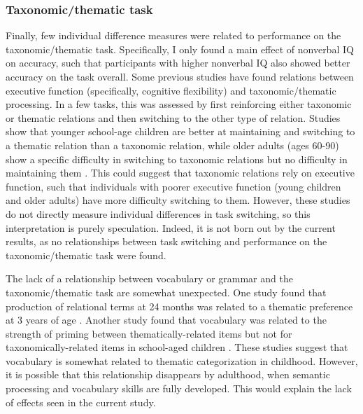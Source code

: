 \documentclass[../dissertation.tex]{subfiles}
\begin{document}
\subsubsection{Taxonomic/thematic task}
	Finally, few individual difference measures were related to performance on the taxonomic/thematic task. Specifically, I only found a main effect of nonverbal IQ on accuracy, such that participants with higher nonverbal IQ also showed better accuracy on the task overall. Some previous studies have found relations between executive function (specifically, cognitive flexibility) and taxonomic/thematic processing. In a few tasks, this was assessed by first reinforcing either taxonomic or thematic relations and then switching to the other type of relation. Studies show that younger school-age children are better at maintaining and switching to a thematic relation than a taxonomic relation, while older adults (ages 60-90) show a specific difficulty in switching to taxonomic relations but no difficulty in maintaining them \citep{Blaye2007, Maintenant2011}. This could suggest that taxonomic relations rely on executive function, such that individuals with poorer executive function (young children and older adults) have more difficulty switching to them. However, these studies do not directly measure individual differences in task switching, so this interpretation is purely speculation. Indeed, it is not born out by the current results, as no relationships between task switching and performance on the taxonomic/thematic task were found. \par 
	The lack of a relationship between vocabulary or grammar and the taxonomic/thematic task are somewhat unexpected. One study found that production of relational terms at 24 months was related to a thematic preference at 3 years of age \citep{Dunham1995}. Another study found that vocabulary was related to the strength of priming between thematically-related items but not for taxonomically-related items in school-aged children \citep{Brooks2014}. These studies suggest that vocabulary is somewhat related to thematic categorization in childhood. However, it is possible that this relationship disappears by adulthood, when semantic processing and vocabulary skills are fully developed. This would explain the lack of effects seen in the current study. \par
	
\end{document}
